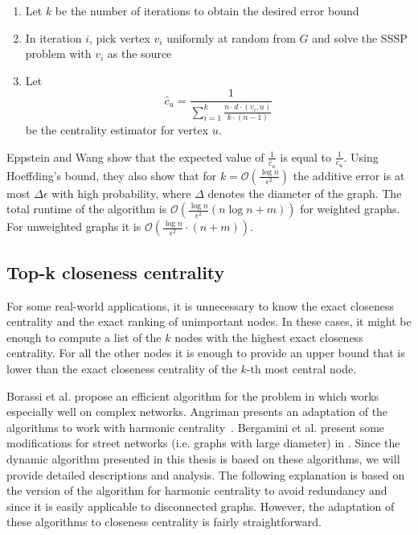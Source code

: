 \begin{enumerate}
	\item Let $k$ be the number of iterations to obtain the desired error bound
	\item In iteration $i$, pick vertex $v_i$ uniformly at random from $G$ and solve the SSSP problem with $v_i$ as the source
	\item Let
		\[
			\hat{c}_u = \frac{1}{\sum_{i = 1}^{k}{\frac{n \cdot d \cdot (v_i, u)}{k \cdot (n - 1)}}} 	
		\] be the centrality estimator for vertex $u$.
\end{enumerate}
Eppstein and Wang show that the expected value of $\frac{1}{\hat{c}_u}$ is equal to $\frac{1}{c_u}$. Using Hoeffding's bound, they also show that for $k = \mathcal{O}(\frac{\log{n}}{\epsilon^2})$ the additive error is at most $\Delta \epsilon$ with high probability, where $\Delta$ denotes the diameter of the graph. The total runtime of the algorithm is $\mathcal{O}\left(\frac{\log{n}}{\epsilon^2} (n \log{n} + m)\right)$ for weighted graphs. For unweighted graphs it is $\mathcal{O}\left(\frac{\log{n}}{\epsilon^2} \cdot (n + m)\right)$.

\subsection{Top-k closeness centrality}
\label{sec:topKClosenessComplex}
For some real-world applications, it is unnecessary to know the exact closeness centrality and the exact ranking of unimportant nodes. In these cases, it might be enough to compute a list of the $k$ nodes with the highest exact closeness centrality. For all the other nodes it is enough to provide an upper bound that is lower than the exact closeness centrality of the $k$-th most central node.

Borassi et al. propose an efficient algorithm for the problem in \cite{borassi2015fast} which works especially well on complex networks. Angriman presents an adaptation of the algorithms to work with harmonic centrality~\cite{angriman2016efficient}. Bergamini et al. present some modifications for street networks (i.e. graphs with large diameter) in \cite{bergamini2016computing}. Since the dynamic algorithm presented in this thesis is based on these algorithms, we will provide detailed descriptions and analysis. The following explanation is based on the version of the algorithm for harmonic centrality to avoid redundancy and since it is easily applicable to disconnected graphs. However, the adaptation of these algorithms to closeness centrality is fairly straightforward. 

